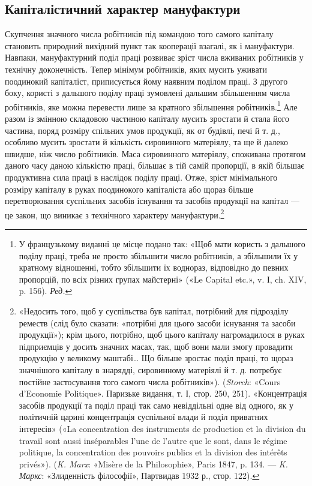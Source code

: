 \subsection{Капіталістичний характер мануфактури}

Скупчення значного числа робітників під командою того
самого капіталу становить природний вихідний пункт так кооперації
взагалі, як і мануфактури. Навпаки, мануфактурний поділ
праці розвиває зріст числа вживаних робітників у технічну
доконечність. Тепер мінімум робітників, яких мусить уживати
поодинокий капіталіст, приписується йому наявним поділом
праці. З другого боку, користі з дальшого поділу праці зумовлені
дальшим збільшенням числа робітників, яке можна перевести
лише за кратного збільшення робітників.\footnote*{
У французькому виданні це місце подано так: «Щоб мати користь
з дальшого поділу праці, треба не просто збільшити число робітників, а
збільшили їх у кратному відношенні, тобто збільшити їх воднораз,
відповідно до певних пропорцій, по всіх різних групах майстерні» («Le
Capital etc.», v. І, ch. XIV, p. 156). \emph{Ред.}
} Але разом із
змінною складовою частиною капіталу мусить зростати й стала
його частина, поряд розміру спільних умов продукції, як от
будівлі, печі й т. д., особливо мусить зростати й кількість сировинного
матеріялу, та ще й далеко швидше, ніж число робітників.
Маса сировинного матеріялу, споживана протягом даного
часу даною кількістю праці, більшає в тій самій пропорції, в
якій більшає продуктивна сила праці в наслідок поділу праці.
Отже, зріст мінімального розміру капіталу в руках поодинокого
капіталіста або щораз більше перетворювання суспільних засобів
існування та засобів продукції на капітал — це закон, що
виникає з технічного характеру мануфактури.\footnote{
«Недосить того, щоб у суспільства був капітал, потрібний для
підрозділу реместв (слід було сказати: «потрібні для цього засоби
існування та засоби продукції»); крім цього, потрібно, щоб цього капіталу
нагромадилося в руках підприємців у досить значних масах, так, щоб
вони мали змогу провадити продукцію у великому маштабі\dots{} Що більше
зростає поділ праці, то щораз значнішого капіталу в знарядді,
сировинному матеріялі й т. д. потребує постійне застосування того самого числа
робітників»). (\emph{Storch}: «Cours d’Economie Politique». Паризьке видання,
т. І, стор. 250, 251). «Концентрація засобів продукції та поділ
праці так само невіддільні одне від одного, як у політичній царині
концентрація суспільної влади й поділ приватних інтересів» («La
concentration des instruments de production et la division du travail sont aussi
inséparables l’une de l’autre que le sont, dans le régime politique, la
concentration des pouvoirs publics et la division des intérêts privés»).
(\emph{K. Marx}: «Misère de la Philosophie», Paris 1847, p. 134. — \emph{K. Маркс}:
«Злиденність філософії», Партвидав 1932 р., стор. 122).
}


